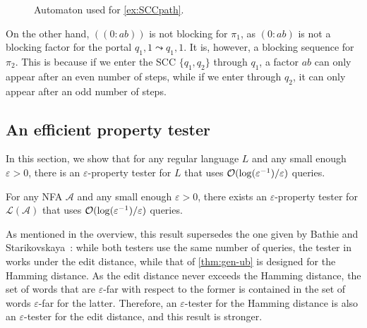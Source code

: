 \documentclass[letterpaper, USenglish, cleveref, autoref, thm-restate, numberwithinsect]{lipics-v2021}
\theoremstyle{theorem}
\theoremstyle{definition}
\newcommand{\Aa}{\mathcal{A}}
\newcommand{\cO}{\mathcal{O}}
\newcommand{\curly}{\mathrel{\leadsto}}
\newcommand{\eps}{\varepsilon}
\newcommand{\lang}[1]{\mathcal{L}(#1)}
\newcommand{\portal}[4]{#1,#2 \curly #3, #4}
\newcommand{\set}[1]{\{ #1 \}}
\newcommand{\timedword}[2]{(#1:#2)}
\newcommand{\epslogeps}[1][]
{\ifthenelse{\equal{#1}{}}{\log(\eps^{-1})/\eps}{\log^{ #1 }(\eps^{-1})/\eps}}
\begin{document}
\begin{example}
\begin{figure}[htbp]
\begin{center}
	\caption{Automaton used for \cref{ex:SCCpath}.}
	\label{fig:SCCpaths}
	\end{center}
	\end{figure}

	On the other hand, $(\timedword{0}{ab})$ is not blocking for $\pi_1$, as $\timedword{0}{ab}$ is not a blocking factor for the portal $\portal{q_1}{1}{q_1}{1}$. It is, however, a blocking sequence for $\pi_2$.
	This is because if we enter the SCC $\set{q_1,q_2}$ through $q_1$, a factor $ab$ can only appear after an even number of steps, while if we enter through $q_2$, it can only appear after an odd number of steps.
\end{example}

\subsection{An efficient property tester}\label{sec:generic-ub}

In this section, we show that for any regular language $L$ and any small enough $\eps > 0$, there is an $\eps$-property tester for $L$ that uses $\cO(\epslogeps)$ queries.

\begin{theorem}\label{thm:gen-ub}
    For any NFA $\Aa$ and any small enough $\eps  >0$, there exists an $\eps$-property tester for $\lang{\Aa}$ that uses $\cO(\epslogeps)$ queries. 
\end{theorem}

As mentioned in the overview, this result supersedes the one  given by Bathie and Starikovskaya~\cite{bathie2021property}:
while both testers use the same number of queries, the tester in~\cite{bathie2021property} works under the edit distance, while that of \cref{thm:gen-ub} is designed for the Hamming distance. As the edit distance never exceeds the Hamming distance, the set of words that are $\eps$-far with respect to the former is contained in the set of words $\eps$-far for the latter. Therefore, an $\eps$-tester for the Hamming distance is also an $\eps$-tester for the edit distance, and this result is stronger.
\end{document}
